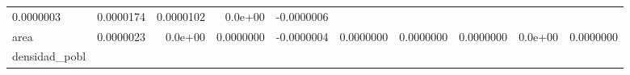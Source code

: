 \documentclass[]{article}
\begin{document}
\begin{longtable}[]{@{}lrrrrrrrrr@{}}
\begin{minipage}[t]{0.07\columnwidth}
0.0000003\strut
\end{minipage} & \begin{minipage}[t]{0.07\columnwidth}\raggedleft\strut
0.0000174\strut
\end{minipage} & \begin{minipage}[t]{0.07\columnwidth}\raggedleft\strut
0.0000102\strut
\end{minipage} & \begin{minipage}[t]{0.06\columnwidth}\raggedleft\strut
0.0e+00\strut
\end{minipage} & \begin{minipage}[t]{0.09\columnwidth}\raggedleft\strut
-0.0000006\strut
\end{minipage}\tabularnewline
\begin{minipage}[t]{0.09\columnwidth}\raggedright\strut
area\strut
\end{minipage} & \begin{minipage}[t]{0.07\columnwidth}\raggedleft\strut
0.0000023\strut
\end{minipage} & \begin{minipage}[t]{0.07\columnwidth}\raggedleft\strut
0.0e+00\strut
\end{minipage} & \begin{minipage}[t]{0.07\columnwidth}\raggedleft\strut
0.0000000\strut
\end{minipage} & \begin{minipage}[t]{0.09\columnwidth}\raggedleft\strut
-0.0000004\strut
\end{minipage} & \begin{minipage}[t]{0.07\columnwidth}\raggedleft\strut
0.0000000\strut
\end{minipage} & \begin{minipage}[t]{0.07\columnwidth}\raggedleft\strut
0.0000000\strut
\end{minipage} & \begin{minipage}[t]{0.07\columnwidth}\raggedleft\strut
0.0000000\strut
\end{minipage} & \begin{minipage}[t]{0.06\columnwidth}\raggedleft\strut
0.0e+00\strut
\end{minipage} & \begin{minipage}[t]{0.09\columnwidth}\raggedleft\strut
0.0000000\strut
\end{minipage}\tabularnewline
\begin{minipage}[t]{0.09\columnwidth}\raggedright\strut
densidad\_pobl\strut
\end{minipage} & \begin{minipage}[t]{0.07\columnwidth}\raggedleft\strut

\end{minipage}
\end{longtable}
\end{document}
